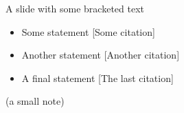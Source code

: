 \begin{frame}{A slide with some bracketed text}

	\begin{itemize}
		\item Some statement {\color{gray} [Some citation]}
		\item Another statement {\color{gray} [Another citation]}
		\item A final statement {\color{gray} [The last citation]}
	\end{itemize}

	\vspace{3ex}
	\begin{center}
		\scriptsize (a small note)
	\end{center}

\end{frame}

